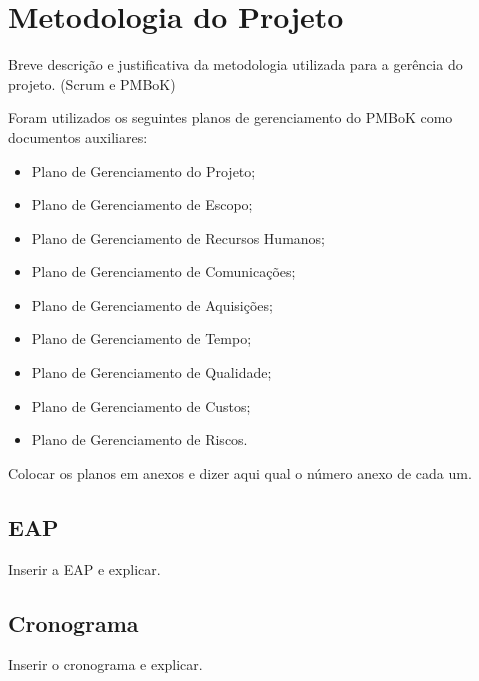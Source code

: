  
\section{Metodologia do Projeto}

Breve descrição e justificativa da metodologia utilizada para a gerência do projeto. (Scrum e PMBoK)

Foram utilizados os seguintes planos de gerenciamento do PMBoK como documentos auxiliares:

  \begin{itemize}
  \item Plano de Gerenciamento do Projeto;
  \item Plano de Gerenciamento de Escopo;
  \item Plano de Gerenciamento de Recursos Humanos;
  \item Plano de Gerenciamento de Comunicações;
  \item Plano de Gerenciamento de Aquisições;
  \item Plano de Gerenciamento de Tempo;
  \item Plano de Gerenciamento de Qualidade;
  \item Plano de Gerenciamento de Custos;
  \item Plano de Gerenciamento de Riscos.
  \end{itemize}
  
  Colocar os planos em anexos e dizer aqui qual o número anexo de cada um.
  
  \subsection{EAP}
   
   Inserir a EAP e explicar.
   
  \subsection{Cronograma}
  
  Inserir o cronograma e explicar.



